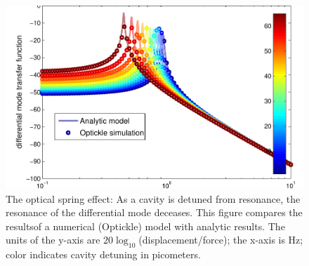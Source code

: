 \begin{figure}
\includegraphics[width=\columnwidth]{figures/model-comparison}
\caption[Optical spring transfer function (numerical and analytic)]{\label{fig:model-comparison}The optical spring effect:  As a cavity is detuned from resonance, the resonance of the differential mode deceases.  This figure compares the resultsof a numerical  (Optickle) model with analytic results. The units of the
  y-axis are $20\log_{10}$(displacement/force); the x-axis is Hz;
  color indicates cavity detuning in picometers.}
\end{figure}
